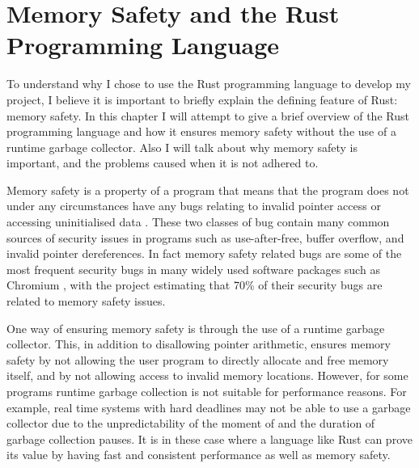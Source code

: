 \chapter{Memory Safety and the Rust Programming Language}
\vspace{1cm}

To understand why I chose to use the Rust programming language to develop my
project, I believe it is important to briefly explain the defining feature of
Rust: memory safety. In this chapter I will attempt to give a brief overview of
the Rust programming language and how it ensures memory safety without the use
of a runtime garbage collector. Also I will talk about why memory safety is
important, and the problems caused when it is not adhered to.

Memory safety is a property of a program that means that the program does not
under any circumstances have any bugs relating to invalid pointer access or
accessing uninitialised data \cite{mem-safety}. These two classes of bug contain
many common sources of security issues in programs such as use-after-free,
buffer overflow, and invalid pointer dereferences. In fact memory safety
related bugs are some of the most frequent security bugs in many widely used
software packages such as Chromium \cite{chromium-mem-safety}, with the project
estimating that 70\% of their security bugs are related to memory safety
issues.

One way of ensuring memory safety is through the use of a runtime garbage
collector. This, in addition to disallowing pointer arithmetic, ensures memory
safety by not allowing the user program to directly allocate and free memory
itself, and by not allowing access to invalid memory locations. However, for
some programs runtime garbage collection is not suitable for performance
reasons. For example, real time systems with hard deadlines may not be able to
use a garbage collector due to the unpredictability of the moment of and the
duration of garbage collection pauses. It is in these case where a language
like Rust can prove its value by having fast and consistent performance as well
as memory safety.

